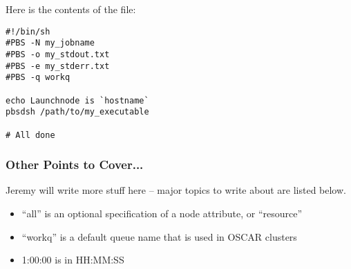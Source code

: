 Here is the contents of the  file:

\begin{verbatim}
#!/bin/sh
#PBS -N my_jobname
#PBS -o my_stdout.txt
#PBS -e my_stderr.txt
#PBS -q workq

echo Launchnode is `hostname`
pbsdsh /path/to/my_executable

# All done
\end{verbatim}

\subsubsection{Other Points to Cover...}

\begin{discuss}
  Jeremy will write more stuff here -- major topics to write about are
  listed below.
\end{discuss}

\begin{itemize}
\item ``all'' is an optional specification of a node attribute, or
  ``resource''
  
\item ``workq'' is a default queue name that is used in OSCAR clusters

\item 1:00:00 is in HH:MM:SS
\end{itemize}

